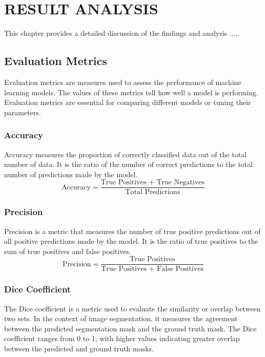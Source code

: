 \chapter{RESULT ANALYSIS}
\label{anotherchapter}
\vspace{-3em}

This chapter provides a detailed discussion of the findings and analysis .....

 \section{Evaluation Metrics}
    Evaluation metrics are measures used to assess the performance of machine learning models. The values of these metrics tell how well a model is performing. Evaluation metrics are essential for comparing different models or tuning their parameters.

 \subsection{Accuracy}
 Accuracy measures the proportion of correctly classified data out of the total number of data. It is the ratio of the number of correct predictions to the total number of predictions made by the model. 
 \begin{equation}
\text{Accuracy} = \frac{\text{True Positives + True Negatives}}{\text{Total Predictions}}
\end{equation}

\subsection{Precision}
Precision is a metric that measures the number of true positive predictions out of all positive predictions made by the model. It is the ratio of true positives to the sum of true positives and false positives. 
\begin{equation}
\text{Precision} = \frac{\text{True Positives}}{\text{True Positives + False Positives}}
\end{equation}



\subsection{Dice Coefficient}
The Dice coefficient is a metric used to evaluate the similarity or overlap between two sets. In the context of image segmentation, it measures the agreement between the predicted segmentation mask and the ground truth mask. The Dice coefficient ranges from 0 to 1, with higher values indicating greater overlap between the predicted and ground truth masks. 

